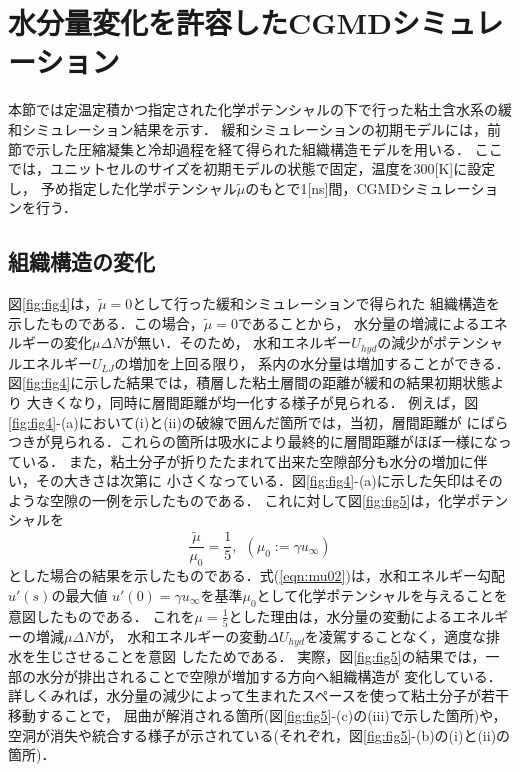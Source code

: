 \section{水分量変化を許容したCGMDシミュレーション}
本節では定温定積かつ指定された化学ポテンシャルの下で行った粘土含水系の緩和シミュレーション結果を示す．
緩和シミュレーションの初期モデルには，前節で示した圧縮凝集と冷却過程を経て得られた組織構造モデルを用いる．
ここでは，ユニットセルのサイズを初期モデルの状態で固定，温度を300[K]に設定し，
予め指定した化学ポテンシャル$\tilde \mu$のもとで1[ns]間，CGMDシミュレーションを行う．
\subsection{組織構造の変化}
図\ref{fig:fig4}は，$\tilde \mu=0$として行った緩和シミュレーションで得られた
組織構造を示したものである．この場合，$\tilde \mu=0$であることから，
水分量の増減によるエネルギーの変化$\mu \Delta N$が無い．そのため，
水和エネルギー$U_{hyd}$の減少がポテンシャルエネルギー$U_{LJ}$の増加を上回る限り，
系内の水分量は増加することができる．
図\ref{fig:fig4}に示した結果では，積層した粘土層間の距離が緩和の結果初期状態より
大きくなり，同時に層間距離が均一化する様子が見られる．
例えば，図\ref{fig:fig4}-(a)において(i)と(ii)の破線で囲んだ箇所では，当初，層間距離が
にばらつきが見られる．これらの箇所は吸水により最終的に層間距離がほぼ一様になっている．
また，粘土分子が折りたたまれて出来た空隙部分も水分の増加に伴い，その大きさは次第に
小さくなっている．図\ref{fig:fig4}-(a)に示した矢印はそのような空隙の一例を示したものである．
%
これに対して図\ref{fig:fig5}は，化学ポテンシャルを
\begin{equation}
	\frac{\tilde \mu}{\mu _0}= \frac{1}{5}
	, \ \ 
	\left( 
		\mu_0:=\gamma u_\infty
	\right)
	\label{eqn:mu02}
\end{equation}
とした場合の結果を示したものである．式(\ref{eqn:mu02})は，水和エネルギー勾配$u'(s)$の最大値
$u'(0)=\gamma u_{\infty}$を基準$\mu_0$として化学ポテンシャルを与えることを意図したものである．
これを$\mu=\frac{1}{5}$とした理由は，水分量の変動によるエネルギーの増減$\mu \Delta N$が，
水和エネルギーの変動$\Delta U_{hyd}$を凌駕することなく，適度な排水を生じさせることを意図
したためである．
実際，図\ref{fig:fig5}の結果では，一部の水分が排出されることで空隙が増加する方向へ組織構造が
変化している．詳しくみれば，水分量の減少によって生まれたスペースを使って粘土分子が若干移動することで，
屈曲が解消される箇所(図\ref{fig:fig5}-(c)の(iii)で示した箇所)や，
空洞が消失や統合する様子が示されている(それぞれ，図\ref{fig:fig5}-(b)の(i)と(ii)の箇所)．
